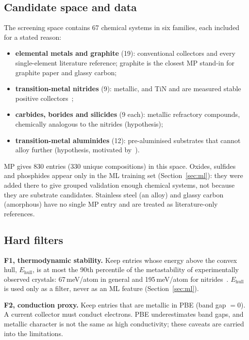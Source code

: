 \documentclass{report}
\newcommand{\Ehull}{E_{\mathrm{hull}}}
\begin{document}
\subsection{Candidate space and data}
The screening space contains 67 chemical systems in six families, each included for a stated reason:
\begin{itemize}[leftmargin=*,itemsep=1pt]
\item \textbf{elemental metals and graphite} (19): conventional collectors and every single-element literature reference; graphite is the closest MP stand-in for graphite paper and glassy carbon;
\item \textbf{transition-metal nitrides} (9): metallic, and TiN and  are measured stable positive collectors~\citep{Wang2018};
\item \textbf{carbides, borides and silicides} (9 each): metallic refractory compounds, chemically analogous to the nitrides (hypothesis);
\item \textbf{transition-metal aluminides} (12): pre-aluminised substrates that cannot alloy further (hypothesis, motivated by~\citep{Cvetkovic2021}).
\end{itemize}
MP gives 830 entries (330 unique compositions) in this space. Oxides, sulfides and phosphides appear only in the ML training set (Section~\ref{sec:ml}): they were added there to give grouped validation enough chemical systems, not because they are substrate candidates. Stainless steel (an alloy) and glassy carbon (amorphous) have no single MP entry and are treated as literature-only references.

\subsection{Hard filters}
\textbf{F1, thermodynamic stability.} Keep entries whose energy above the convex hull, $\Ehull$, is at most the 90th percentile of the metastability of experimentally observed crystals: 67\,meV/atom in general and 195\,meV/atom for nitrides~\citep{Sun2016}. $\Ehull$ is used only as a filter, never as an ML feature (Section~\ref{sec:ml}).

\noindent\textbf{F2, conduction proxy.} Keep entries that are metallic in PBE (band gap $=0$). A current collector must conduct electrons. PBE underestimates band gaps, and metallic character is not the same as high conductivity; these caveats are carried into the limitations.
\end{document}
